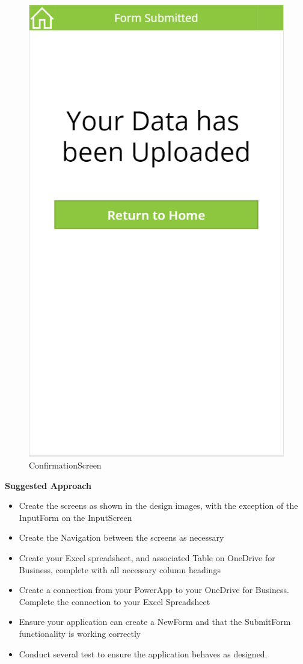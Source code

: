 \begin{figure}[th]
	\centering
	\includegraphics[width=0.7\linewidth]{img/ConfirmationScreen}
	\caption[ConfirmationScreen]{ConfirmationScreen}
	\label{fig:confirmationscreen}
\end{figure}




\vspace{.5cm}

\textbf{Suggested Approach}

\begin{itemize}
	\item Create the screens as shown in the design images, with the exception of the InputForm on the InputScreen
	\item Create the Navigation between the screens as necessary
	\item Create your Excel spreadsheet, and associated Table on OneDrive for Business, complete with all necessary column headings
	\item Create a connection from your PowerApp to your OneDrive for Business.  Complete the connection to your Excel Spreadsheet
	\item Ensure your application can create a NewForm and that the SubmitForm functionality is working correctly
	\item Conduct several test to ensure the application behaves as designed.
\end{itemize}



